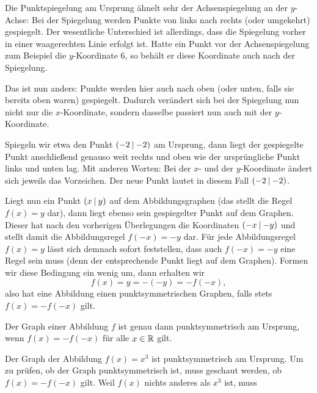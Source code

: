 \documentclass[../../main.tex]{subfiles}
\begin{document}
Die Punktspiegelung am Ursprung ähnelt sehr der Achsenspiegelung an der $y$-Achse: Bei der Spiegelung werden Punkte von links nach rechts (oder umgekehrt) gespiegelt. Der wesentliche Unterschied ist allerdings, dass die Spiegelung vorher in einer waagerechten Linie erfolgt ist. Hatte ein Punkt vor der Achsenspiegelung zum Beispiel die $y$-Koordinate $6$, so behält er diese Koordinate auch nach der Spiegelung.

Das ist nun anders: Punkte werden hier auch nach oben (oder unten, falls sie bereits oben waren) gespiegelt. Dadurch verändert sich bei der Spiegelung nun nicht nur die $x$-Koordinate, sondern dasselbe passiert nun auch mit der $y$-Koordinate.

Spiegeln wir etwa den Punkt $\left(-2 \:\middle|\: -2\right)$ am Ursprung, dann liegt der gespiegelte Punkt anschließend genauso weit rechts und oben wie der ursprüngliche Punkt links und unten lag. Mit anderen Worten: Bei der $x$- und der $y$-Koordinate ändert sich jeweils das Vorzeichen. Der neue Punkt lautet in diesem Fall $\left(-2 \:\middle|\: -2\right)$.

Liegt nun ein Punkt $\left(x \:\middle|\: y\right)$ auf dem Abbildungsgraphen (das stellt die Regel $f(x)=y$ dar), dann liegt ebenso sein gespiegelter Punkt auf dem Graphen. Dieser hat nach den vorherigen Überlegungen die Koordinaten $\left(-x \:\middle|\: -y\right)$ und stellt damit die Abbildungsregel $f(-x)=-y$ dar. Für jede Abbildungsregel $f(x)=y$ lässt sich demnach sofort feststellen, dass auch $f(-x)=-y$ eine Regel sein muss (denn der entsprechende Punkt liegt auf dem Graphen). Formen wir diese Bedingung ein wenig um, dann erhalten wir \[f(x)=y=-(-y)=-f(-x),\]
also hat eine Abbildung einen punktsymmetrischen Graphen, falls stets $f(x)=-f(-x)$ gilt.

\begin{theorem}
    Der Graph einer Abbildung $f$ ist genau dann punktsymmetrisch am Ursprung, wenn $f(x)=-f(-x)$ für alle $x\in\mathbb{R}$ gilt.
\end{theorem}

\begin{example}
    Der Graph der Abbildung $f(x)=x^3$ ist punktsymmetrisch am Ursprung. Um zu prüfen, ob der Graph punktsymmetrisch ist, muss geschaut werden, ob $f(x)=-f(-x)$ gilt. Weil $f(x)$ nichts anderes als $x^3$ ist, muss 
\end{example}
\end{document}
